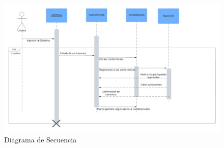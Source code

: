 \begin{figure}[H]
	\centering
	\includegraphics[width=1\linewidth]{Imagenes/Diagramas/Secuencia}
	\caption{Diagrama de Secuencia}
	\label{fig:secuencia}
\end{figure}





